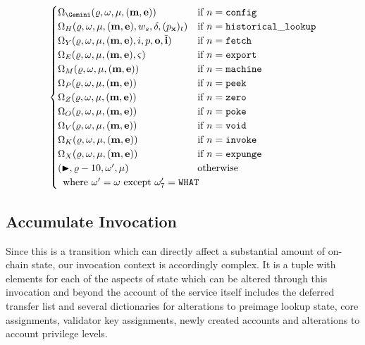 \begin{align}
\begin{cases}
      \Omega_\Gemini(\gascounter, \registers, \memory, (\mathbf{m}, \mathbf{e})) &\when n = \mathtt{config} \\
      \Omega_H(\gascounter, \registers, \memory, (\mathbf{m}, \mathbf{e}), w_s, \delta, (p_\mathbf{x})_t) &\when n = \mathtt{historical\_lookup}\\
      \Omega_Y(\gascounter, \registers, \memory, (\mathbf{m}, \mathbf{e}), i, p, \mathbf{o}, \overline{\mathbf{i}}) &\when n = \mathtt{fetch}\\
      \Omega_E(\gascounter, \registers, \memory, (\mathbf{m}, \mathbf{e}), \segoff) &\when n = \mathtt{export}\\
      \Omega_M(\gascounter, \registers, \memory, (\mathbf{m}, \mathbf{e})) &\when n = \mathtt{machine}\\
      \Omega_P(\gascounter, \registers, \memory, (\mathbf{m}, \mathbf{e})) &\when n = \mathtt{peek}\\
      \Omega_Z(\gascounter, \registers, \memory, (\mathbf{m}, \mathbf{e})) &\when n = \mathtt{zero}\\
      \Omega_O(\gascounter, \registers, \memory, (\mathbf{m}, \mathbf{e})) &\when n = \mathtt{poke}\\
      \Omega_V(\gascounter, \registers, \memory, (\mathbf{m}, \mathbf{e})) &\when n = \mathtt{void}\\
      \Omega_K(\gascounter, \registers, \memory, (\mathbf{m}, \mathbf{e})) &\when n = \mathtt{invoke}\\
      \Omega_X(\gascounter, \registers, \memory, (\mathbf{m}, \mathbf{e})) &\when n = \mathtt{expunge}\\
      (\continue, \gascounter - 10, \registers', \memory) &\otherwise\\
      \multicolumn{2}{l}{\where \registers' = \registers \exc \registers'_7 = \mathtt{WHAT}}
    \end{cases}
\end{align}

\subsection{Accumulate Invocation}\label{sec:accumulateinvocation}

Since this is a transition which can directly affect a substantial amount of on-chain state, our invocation context is accordingly complex. It is a tuple with elements for each of the aspects of state which can be altered through this invocation and beyond the account of the service itself includes the deferred transfer list and several dictionaries for alterations to preimage lookup state, core assignments, validator key assignments, newly created accounts and alterations to account privilege levels.

